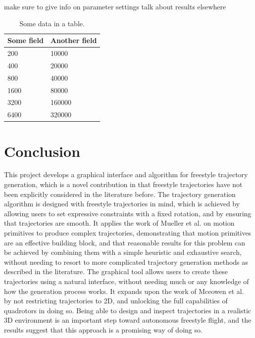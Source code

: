 \documentclass[pageno]{jpaper}
\begin{document}
make sure to give info on parameter settings
talk about results elsewhere
\begin{table}[hbt]
  \centering
  \begin{tabular}{|l|l|} \hline
    \textbf{Some field} & \textbf{Another field}\\\hline
    200          &  10000 \\ \hline 
    400          &  20000 \\ \hline 
    800          &  40000 \\ \hline 
    1600        &  80000 \\ \hline 
    3200        &  160000 \\ \hline 
    6400        &  320000 \\ \hline 
  \end{tabular}
  \caption{Some data in a table. }
  \label{table:data}
\end{table}

\section{Conclusion}

This project develops a graphical interface and algorithm for freestyle trajectory generation, which is a novel contribution in that freestyle trajectories have not been explicitly considered in the literature before. The trajectory generation algorithm is designed with freestyle trajectories in mind, which is achieved by allowing users to set expressive constraints with a fixed rotation, and by ensuring that trajectories are smooth. It applies the work of Mueller et al. on motion primitives to produce complex trajectories, demonstrating that motion primitives are an effective building block, and that reasonable results for this problem can be achieved by combining them with a simple heuristic and exhaustive search, without needing to resort to more complicated trajectory generation methods as described in the literature. The graphical tool allows users to create these trajectories using a natural interface, without needing much or any knowledge of how the generation process works. It expands upon the work of Mceowen et al. by not restricting trajectories to 2D, and unlocking the full capabilities of quadrotors in doing so. Being able to design and inspect trajectories in a realistic 3D environment is an important step toward autonomous freestyle flight, and the results suggest that this approach is a promising way of doing so.
\end{document}
